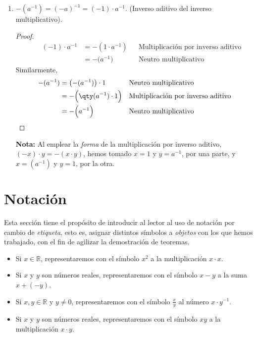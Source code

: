 \documentclass[11pt]{article}
\newcommand{\R}{\mathbb{R}}
\begin{document}
\begin{enumerate}[label=\alph*)]
\begin{enumerate}[label=\roman*)]
\pagebreak

        \item $-(a^{-1})=(-a)^{-1}=(-1)\cdot a^{-1}$. (Inverso aditivo del inverso multiplicativo).
        \begin{proof} 
        \begin{align*}
        \qquad (-1)\cdot a^{-1} &= -(1\cdot a^{-1}) && \text{Multiplicación por inverso aditivo}\\
        \qquad &= -\bigl(a^{-1}\bigr) && \text{Neutro multiplicativo}
        \end{align*}
        Similarmente,
        \begin{align*}
            -(a^{-1}) &= \bigl(-(a^{-1})\bigr) \cdot 1 && \text{Neutro multiplicativo}\\
            &= -\Bigl(\qty(a^{-1})\cdot 1\Bigr) && \text{Multiplicación por inverso aditivo}\\
            &= -\Bigl(a^{-1}\Bigr) && \text{Neutro multiplicativo} \qedhere
        \end{align*}
        \end{proof} \vspace{-1em}
        \textbf{Nota:} Al emplear la \textit{forma} de la multiplicación por inverso aditivo, $(-x)\cdot y = -(x\cdot y)$, hemos tomado $x=1$ y $y=a^{-1}$, por una parte, y $x=(a^{-1})$ y $y=1$, por la otra.
    \end{enumerate}%

\end{enumerate}

\section*{Notación}

Esta sección tiene el propósito de introducir al lector al uso de notación por cambio de \textit{etiqueta}, esto es, asignar distintos símbolos a \textit{objetos} con los que hemos trabajado, con el fin de agilizar la demostración de teoremas.
\begin{itemize}
\item Si $x\in \R$, representaremos con el símbolo $x^2$ a la multiplicación $x\cdot x$.%
\item Si $x$ y $y$ son números reales, representaremos con el símbolo $x-y$ a la suma $x+(-y)$.
\item Si $x,y\in \R$ y $y\neq 0$, representaremos con el símbolo $ \frac{x}{y}$ al número $x \cdot y^{-1}$.
\item Si $x$ y $y$ son números reales, representaremos con el símbolo $xy$ a la multiplicación $x\cdot y$.
\end{itemize}
\end{document}
